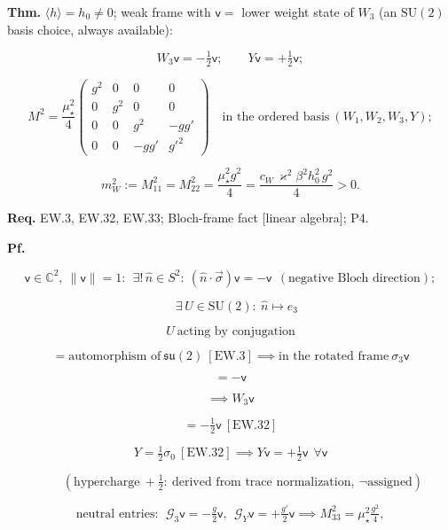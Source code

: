 \begin{theorem}\label{tag:EW-20}
\textbf{Thm.} $\langle h\rangle=h_0\ne0$; weak frame with $\mathsf v=$ lower weight state of $W_3$ (an $\mathrm{SU}(2)$ basis choice, always available):

\[
W_3\mathsf v=-\tfrac12\mathsf v;\qquad Y\mathsf v=+\tfrac12\mathsf v;
\]

\[
M^2=\frac{\mu_\star^2}{4}
\begin{pmatrix}
g^2&0&0&0\\
0&g^2&0&0\\
0&0&g^2&-gg'\\
0&0&-gg'&g'^2
\end{pmatrix}
\quad\text{in the ordered basis}\ (W_1,W_2,W_3,Y);
\]

\[
m_W^2:=M^2_{11}=M^2_{22}=\frac{\mu_\star^2g^2}{4}=\frac{c_W\,\varkappa^2\beta^2h_0^2\,g^2}{4}>0 .
\]

\textbf{Req.} EW.3, EW.32, EW.33; Bloch-frame fact [linear algebra]; P4.

\textbf{Pf.}

\[
\mathsf v\in\mathbb C^2,\ \|\mathsf v\|=1:\ \ \exists!\,\hat n\in S^2:\ (\hat n\cdot\vec\sigma)\mathsf v=-\mathsf v\ \ (\text{negative Bloch direction});
\]

\[
\quad \exists\,U\in\mathrm{SU}(2):\ \hat n\mapsto e_3
\]

\[
U\ \text{acting by conjugation}
\]

\[
= \text{automorphism of}\ \mathfrak{su}(2)\ [\mathrm{EW.3}]\implies\text{in the rotated frame}\ \sigma_3\mathsf v
\]

\[
= -\mathsf v
\]

\[
\implies W_3\mathsf v
\]

\[
= -\tfrac12\mathsf v\ [\mathrm{EW.32}]
\]

\[
Y=\tfrac12\sigma_0\ [\mathrm{EW.32}]\implies Y\mathsf v=+\tfrac12\mathsf v\ \ \forall\mathsf v
\]

\[
\qquad (\text{hypercharge}\ +\tfrac12:\ \text{derived from trace normalization},\ \neg\text{assigned})
\]

\[
\text{neutral entries}:\ \ \mathcal G_3\mathsf v=-\tfrac g2\mathsf v,\ \ \mathcal G_Y\mathsf v=+\tfrac{g'}2\mathsf v\implies
M^2_{33}=\mu_\star^2\tfrac{g^2}4,
\]


\end{theorem}
